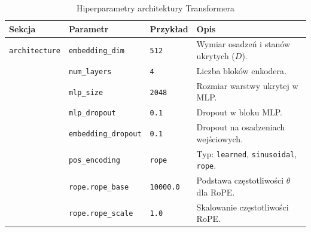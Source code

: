 \documentclass[a4paper,11pt,twoside]{report}
\theoremstyle{definition}
\begin{document}
\begin{table}[h!]
\centering
\caption{Hiperparametry architektury Transformera}
\label{tab:params_architecture}
\small
\smallskip
\begin{tabularx}{\textwidth}{@{}lllX@{}}
\toprule
\textbf{Sekcja} & \textbf{Parametr} & \textbf{Przykład} & \textbf{Opis} \\
\midrule
\texttt{architecture} 
    & \texttt{embedding\_dim} & \texttt{512} & Wymiar osadzeń i stanów ukrytych ($D$). \\
    & \texttt{num\_layers} & \texttt{4} & Liczba bloków enkodera. \\
    & \texttt{mlp\_size} & \texttt{2048} & Rozmiar warstwy ukrytej w MLP. \\
    & \texttt{mlp\_dropout} & \texttt{0.1} & Dropout w bloku MLP. \\
    & \texttt{embedding\_dropout} & \texttt{0.1} & Dropout na osadzeniach wejściowych. \\
    & \texttt{pos\_encoding} & \texttt{rope} & Typ: \texttt{learned}, \texttt{sinusoidal}, \texttt{rope}. \\
    & \texttt{rope.rope\_base} & \texttt{10000.0} & Podstawa częstotliwości $\theta$ dla RoPE. \\
    & \texttt{rope.rope\_scale} & \texttt{1.0} & Skalowanie częstotliwości RoPE. \\
\bottomrule
\end{tabularx}
\end{table}
\end{document}
